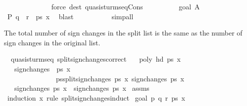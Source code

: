 \begin{isabellebody}
\ \ \ \ \ \ \ \ \ \ \ \ \isamarkupfalse%
\ {\isacharparenleft}force\ dest{\isacharcolon}\ quasi{\isacharunderscore}sturm{\isacharunderscore}seq{\isacharunderscore}Cons{\isacharparenright}\isanewline
\ \ \ \ \ \ \ \ \isamarkupfalse%
\ goal{}\ A\ \isamarkupfalse%
\ {\isachardoublequoteopen}P\ {\isacharparenleft}q\ {\isacharhash}\ r\ {\isacharhash}\ ps{\isacharparenright}\ x{\isachardoublequoteclose}\ \isamarkupfalse%
\ blast\isanewline
\ \ \ \ \ \ \isamarkupfalse%
\isanewline
\ \ \isamarkupfalse%
\ simp{\isacharunderscore}all\ \ \isanewline
{}\isamarkupfalse%
%
\endisatagproof
{\isafoldproof}%
%
\isadelimproof
%
\endisadelimproof
%
\begin{isamarkuptext}%
The total number of sign changes in the split list is the same
  as the number of sign changes in the original list.%
\end{isamarkuptext}%
\isamarkuptrue%
\isamarkupfalse%
\ {\isacharparenleft}\ quasi{\isacharunderscore}sturm{\isacharunderscore}seq{\isacharparenright}\ split{\isacharunderscore}sign{\isacharunderscore}changes{\isacharunderscore}correct{\isacharcolon}\isanewline
\ \ \ {\isachardoublequoteopen}poly\ {\isacharparenleft}hd\ ps{\isacharparenright}\ x\ {\isasymnoteq}\ {}{\isachardoublequoteclose}\isanewline
\ \ \ {\isachardoublequoteopen}sign{\isacharunderscore}changes{\isacharprime}\ {\isasymequiv}\ {\isasymlambda}ps\ x{\isachardot}\ \isanewline
\ \ \ \ \ \ \ \ \ \ \ \ \ \ \ {\isasymSum}ps{\isacharprime}{\isasymleftarrow}split{\isacharunderscore}sign{\isacharunderscore}changes\ ps\ x{\isachardot}\ sign{\isacharunderscore}changes\ ps{\isacharprime}\ x{\isachardoublequoteclose}\isanewline
\ \ \ {\isachardoublequoteopen}sign{\isacharunderscore}changes{\isacharprime}\ ps\ x\ {\isacharequal}\ sign{\isacharunderscore}changes\ ps\ x\isanewline
%
\isadelimproof
%
\endisadelimproof
%
\isatagproof
{}\isamarkupfalse%
\ assms{\isacharparenleft}{}{\isacharparenright}\isanewline
{}\isamarkupfalse%
\ {\isacharparenleft}induction\ x\ rule{\isacharcolon}\ split{\isacharunderscore}sign{\isacharunderscore}changes{\isacharunderscore}induct{\isacharparenright}\isanewline
{}\isamarkupfalse%
\ {\isacharparenleft}goal{}\ p\ q\ r\ ps\ x\isanewline

\end{isabellebody}
